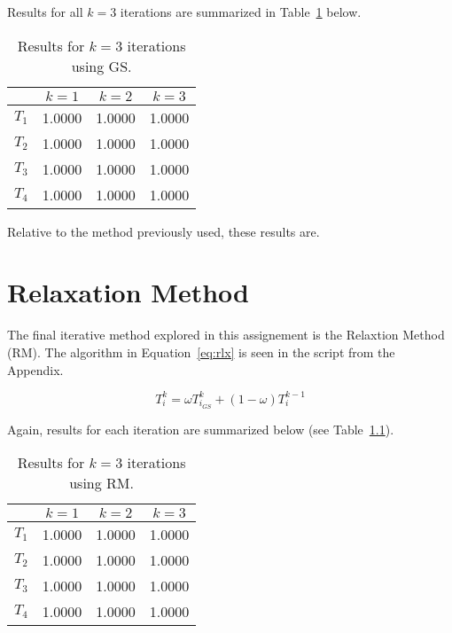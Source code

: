 Results for all $k=3$ iterations are summarized in Table~\ref{tab:gs} below.

\begin{table}[H]
  \centering
  \caption{Results for $k=3$ iterations using GS.}
    \begin{tabular}{cccc}
    \hline
          & $k=1$ & $k=2$ & $k=3$ \\
    \midrule
    $T_1$ & 1.0000 & 1.0000 & 1.0000 \\
    $T_2$ & 1.0000 & 1.0000 & 1.0000 \\
    $T_3$ & 1.0000 & 1.0000 & 1.0000 \\
    $T_4$ & 1.0000 & 1.0000 & 1.0000 \\
    \hline
    \end{tabular}
  \label{tab:gs}
\end{table}

Relative to the method previously used, these results are. \\

\chapter{Relaxation Method}
\label{chap:relax}


The final iterative method explored in this assignement is the Relaxtion Method (RM). The algorithm in Equation~\ref{eq:rlx} \cite{cfdbook} is seen in the script from the Appendix.

\begin{equation}
	\label{eq:rlx}	
	T_i^k = \omega T_{i_{GS}}^k +(1-\omega)T_i^{k-1}
\end{equation}

Again, results for each iteration are summarized below (see Table~\ref{tab:rm}).

\begin{table}[H]
  \centering
  \caption{Results for $k=3$ iterations using RM.}
    \begin{tabular}{cccc}
    \hline
          & $k=1$ & $k=2$ & $k=3$ \\
    \midrule
    $T_1$ & 1.0000 & 1.0000 & 1.0000 \\
    $T_2$ & 1.0000 & 1.0000 & 1.0000 \\
    $T_3$ & 1.0000 & 1.0000 & 1.0000 \\
    $T_4$ & 1.0000 & 1.0000 & 1.0000 \\
    \hline
    \end{tabular}
  \label{tab:rm}
\end{table}



